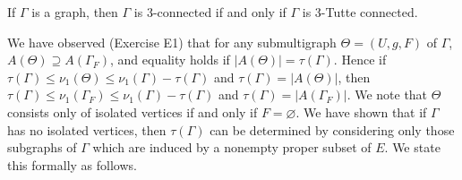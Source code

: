 If $\Gamma$ is a graph, then $\Gamma$ is 3-connected if and only if $\Gamma$ is 3-Tutte connected.

We have observed (Exercise E1) that for any submultigraph $\Theta = (U, g, F)$ of $\Gamma$, $A(\Theta) \supseteq A(\Gamma_F)$, and equality holds if $|A(\Theta)| = \tau(\Gamma)$. Hence if $\tau(\Gamma) \leq \nu_1(\Theta) \leq \nu_1(\Gamma) - \tau(\Gamma)$ and $\tau(\Gamma) = |A(\Theta)|$, then $\tau(\Gamma) \leq \nu_1(\Gamma_F) \leq \nu_1(\Gamma) - \tau(\Gamma)$ and $\tau(\Gamma) = |A(\Gamma_F)|$. We note that $\Theta$ consists only of isolated vertices if and only if $F = \varnothing$. We have shown that if $\Gamma$ has no isolated vertices, then $\tau(\Gamma)$ can be determined by considering only those subgraphs of $\Gamma$ which are induced by a nonempty proper subset of $E$. We state this formally as follows.
